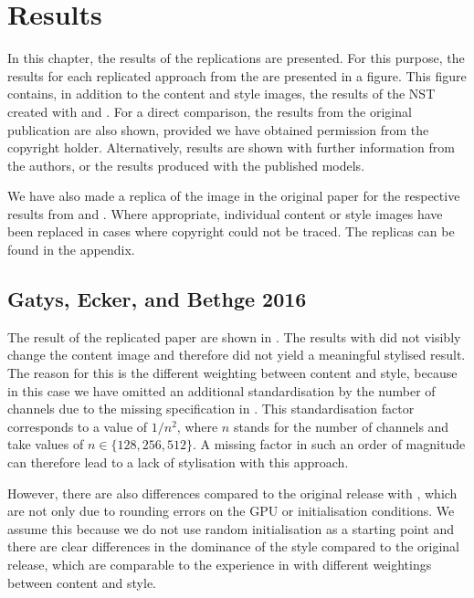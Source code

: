 \section{Results}
In this chapter, the results of the replications are presented. For this purpose, the results for each replicated approach from the  are presented in a figure. This figure contains, in addition to the content and style images, the results of the \gls{NST} created with \paper{} and \implementation{}. For a direct comparison, the results from the original publication are also shown, provided we have obtained permission from the copyright holder. Alternatively, results are shown with further information from the authors, or the results produced with the published models.

We have also made a replica of the image in the original paper for the respective results from \paper{} and \implementation{}. Where appropriate, individual content or style images have been replaced in cases where copyright could not be traced. The replicas can be found in the appendix. 

\subsection{Gatys, Ecker, and Bethge 2016} \label{sec:Gatys1results}
The result of the replicated paper \cite{GEB2016} are shown in . The results with \paper{} did not visibly change the content image and therefore did not yield a meaningful stylised result. The reason for this is the different weighting between content and style, because in this case we have omitted an additional standardisation by the number of channels due to the missing specification in \paper{}. This standardisation factor corresponds to a value of $1/n^2$, where $n$ stands for the number of channels and take values of $n \in \{128, 256, 512\}$. A missing factor in such an order of magnitude can therefore lead to a lack of stylisation with this approach.

However, there are also differences compared to the original release with \implementation{}, which are not only due to rounding errors on the \gls{GPU} or initialisation conditions. We assume this because we do not use random initialisation as a starting point and there are clear differences in the dominance of the style compared to the original release, which are comparable to the experience in  with different weightings between content and style.

